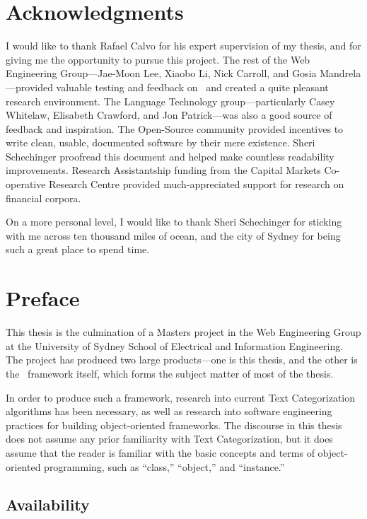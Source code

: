 \chapter{Acknowledgments}

I would like to thank Rafael Calvo for his expert supervision of my
thesis, and for giving me the opportunity to pursue this project.  The
rest of the Web Engineering Group---Jae-Moon Lee, Xiaobo Li, Nick
Carroll, and Gosia Mandrela---provided valuable testing and feedback
on \aicat\ and created a quite pleasant research environment.  The
Language Technology group---particularly Casey Whitelaw, Elisabeth
Crawford, and Jon Patrick---was also a good source of feedback and
inspiration.  The Open-Source community provided incentives to write
clean, usable, documented software by their mere existence.  Sheri
Schechinger proofread this document and helped make countless
readability improvements.  Research
Assistantship funding from the Capital Markets Co-operative Research
Centre provided much-appreciated support for research on financial
corpora.

On a more personal level, I would like to thank Sheri Schechinger for sticking
with me across ten thousand miles of ocean, and the city of Sydney for
being such a great place to spend time.

\chapter{Preface}

This thesis is the culmination of a Masters project in the Web
Engineering Group at the University of Sydney School of Electrical and
Information Engineering.  The project has produced two large
products---one is this thesis, and the other is the \aicat\ framework
itself, which forms the subject matter of most of the thesis.

In order to produce such a framework, research into current Text
Categorization algorithms has been necessary, as well as research into
software engineering practices for building object-oriented
frameworks.  The discourse in this thesis does not assume any prior
familiarity with Text Categorization, but it does assume that the
reader is familiar with the basic concepts and terms of
object-oriented programming, such as ``class,'' ``object,'' and
``instance.''


\section*{Availability}

